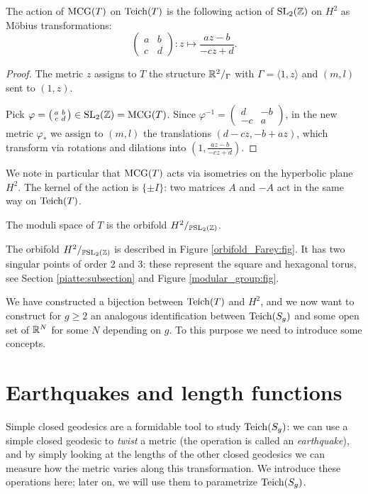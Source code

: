 \begin{prop}  \label{toro:azione:prop}
The action of ${\rm MCG}(T)$ on ${\rm Teich}(T)$ is the following action of ${\rm SL}_2(\mathbb{Z})$ on $H^2$ as M\"obius transformations: 
$$\begin{pmatrix} a & b \\ c & d \end{pmatrix} \colon z \longmapsto \frac{az-b}{-cz+d}.$$
\end{prop}
\begin{proof}
The metric $z$ assigns to $T$ the structure $\mathbb{R}^2/_\Gamma$ with $\Gamma = \langle 1,z \rangle$ and $(m,l)$ sent to $(1,z)$. 

Pick $\varphi =  \left(\begin{smallmatrix} a & b \\ c & d \end{smallmatrix}\right) \in {\rm SL}_2(\mathbb{Z}) ={\rm MCG}(T)$. Since $\varphi^{-1} = \left(\begin{smallmatrix} d & -b \\ -c & a \end{smallmatrix}\right)$, in the new metric $\varphi_*$ we assign to $(m,l)$ the translations $(d-cz, -b+az)$, which transform via rotations and dilations into $(1,  \frac{az-b}{-cz+d}).$
\end{proof}

We note in particular that ${\rm MCG}(T)$ acts via isometries on the hyperbolic plane $H^2$. The kernel of the action is $\{\pm I\}$: two matrices $A$ and $-A$ act in the same way on ${\rm Teich}(T)$. 

\begin{cor}
The moduli space of $T$ is the orbifold $H^2/_{\mathbb{P}{\rm SL}_2(\mathbb{Z})}$.
\end{cor}

The orbifold $H^2/_{\mathbb{P}{\rm SL}_2(\mathbb{Z})}$ is described in Figure \ref{orbifold_Farey:fig}. It has two singular points of order 2 and 3: these represent the square and hexagonal torus, see Section \ref{piatte:subsection} and Figure \ref{modular_group:fig}.

We have constructed a bijection between ${\rm Teich}(T)$ and $H^2$, and we now want to construct for $g\geqslant 2$ an analogous identification between ${\rm Teich}(S_g)$ and some open set of $\mathbb{R}^N$ for some $N$ depending on $g$. To this purpose we need to introduce some concepts.

\section{Earthquakes and length functions}
Simple closed geodesics are a formidable tool to study ${\rm Teich}(S_g)$: we can use a simple closed geodesic to \emph{twist} a metric (the operation is called an \emph{earthquake}), and by simply looking at the lengths of the other closed geodesics we can measure how the metric varies along this transformation. We introduce these operations here; later on, we will use them to parametrize ${\rm Teich}(S_g)$.

